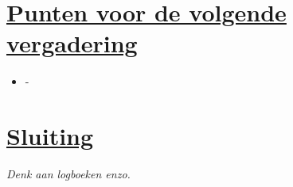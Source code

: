 \documentclass[a4paper]{article}
\begin{document}

\section{\underline{Punten voor de volgende vergadering}} %
\label{sec:punten_voor_de_volgende_vergadering}

\begin{itemize}
\item -
\end{itemize}


\section{\underline{Sluiting}} %
\label{sec:sluiting}
\small{\emph{Denk aan logboeken enzo.}}

\end{document}
